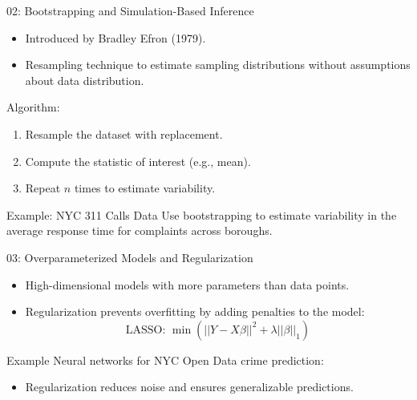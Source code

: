 \documentclass{beamer}
\begin{document}
\begin{frame}{02: Bootstrapping and Simulation-Based Inference}
\begin{itemize}
    \item Introduced by Bradley Efron (1979).
    \item Resampling technique to estimate sampling distributions without assumptions about data distribution.
\end{itemize}

\begin{exampleblock}{Algorithm:}
\begin{enumerate}
    \item Resample the dataset with replacement.
    \item Compute the statistic of interest (e.g., mean).
    \item Repeat \( n \) times to estimate variability.
\end{enumerate}
\end{exampleblock}

\begin{block}{Example: NYC 311 Calls Data}
Use bootstrapping to estimate variability in the average response time for complaints across boroughs.
\end{block}
\end{frame}

\begin{frame}{03: Overparameterized Models and Regularization}
\begin{itemize}
    \item High-dimensional models with more parameters than data points.
    \item Regularization prevents overfitting by adding penalties to the model:
    \[
    \text{LASSO: } \min \left( ||Y - X\beta||^2 + \lambda ||\beta||_1 \right)
    \]
\end{itemize}

\begin{block}{Example}
Neural networks for NYC Open Data crime prediction:
\begin{itemize}
    \item Regularization reduces noise and ensures generalizable predictions.
\end{itemize}
\end{block}
\end{frame}
\end{document}
